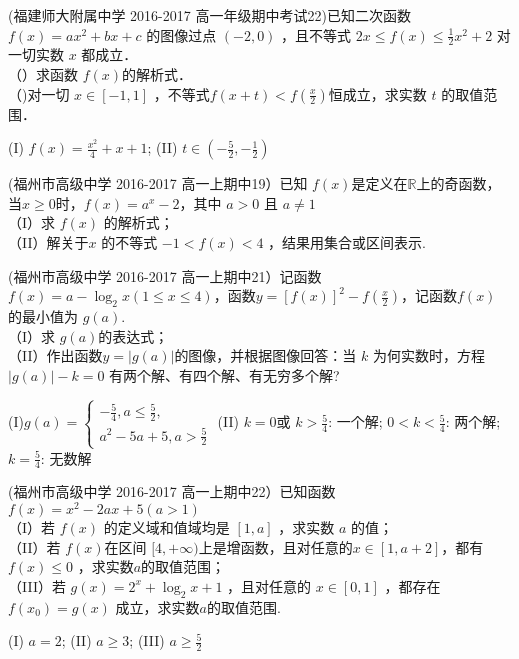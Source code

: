 (福建师大附属中学 2016-2017 高一年级期中考试22)已知二次函数 $f ( x )= ax^2+ bx+ c$ 的图像过点 $(-2,0)$ ，且不等式 $2 x\leq f ( x )\leq \frac12x^2+ 2$ 对一切实数 $x$ 都成立．\\
（）求函数 $f ( x ) $的解析式． \\
（)对一切 $x\in[-1,1] $ ，不等式$f(x+t)<f(\frac x2) $恒成立，求实数 $t$ 的取值范围．
\begin{answers}
(I) $f(x)=\frac{x^2}4+x+1 $; (II) $t\in (-\frac52,-\frac12) $
\end{answers}

(福州市高级中学 2016-2017 高一上期中19）已知 $f(x)$是定义在$\mathbb{R}$上的奇函数，当$x\geq0$时，$f(x)=a^x-2$，其中 $a> 0$ 且 $a\neq 1$\\
（I）求 $f (x )$ 的解析式；\\
（II）解关于$x$ 的不等式 $-1< f(x)<4$ ，结果用集合或区间表示.


(福州市高级中学 2016-2017 高一上期中21）记函数 $f (x )=a-\log_2{x}(1\leq x\leq 4)$，函数$y=[f(x)]^2-f(\frac x2)$，记函数$f(x)$ 的最小值为 $g( a)$.\\
（I）求 $g( a) $的表达式；\\
（II）作出函数$y=|g(a)|$的图像，并根据图像回答：当 $k$ 为何实数时，方程$|g( a)|-k=0$ 有两个解、有四个解、有无穷多个解?
\begin{answers}
(I)$g(a)=\begin{cases}-\frac54,a\leq\frac52,\\a^2-5a+5,a>\frac52\end{cases} $
(II) $k=0$或 $k>\frac54 $: 一个解;  $0<k<\frac54$: 两个解;   $k=\frac54$: 无数解
\end{answers}


(福州市高级中学 2016-2017 高一上期中22）已知函数$f(x)=x^2-2ax+5(a>1)$\\
（I）若 $f (x )$ 的定义域和值域均是 $[1, a]$ ，求实数 $a$ 的值； \\
（II）若 $f (x ) $在区间 $[4,+\infty)$上是增函数，且对任意的$ x \in[1, a+ 2]$，都有 $f( x )\leq 0$ ，求实数$a$的取值范围；\\
（III）若 $g( x )=2^x+\log_2{x+ 1 }$ ，且对任意的 $x \in[0,1]$ ，都存在$f(x_0)=g(x)$ 成立，求实数$a$的取值范围.
\begin{answers}
(I) $a=2$; (II) $a\geq3$; (III) $a\geq\frac52$
\end{answers}

